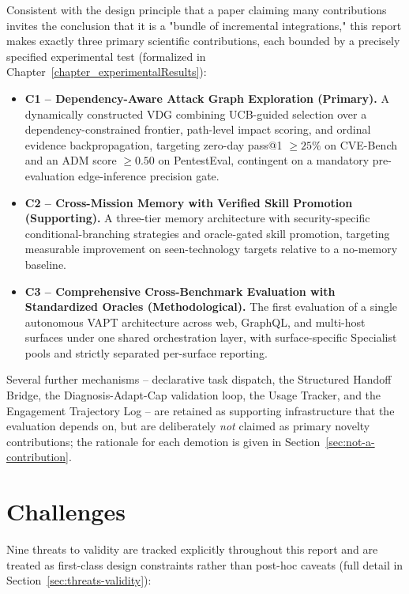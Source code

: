 Consistent with the design principle that a paper claiming many contributions invites the conclusion that it is a "bundle of incremental integrations," this report makes exactly three primary scientific contributions, each bounded by a precisely specified experimental test (formalized in Chapter~\ref{chapter_experimentalResults}):

\begin{itemize}
    \item \textbf{C1 -- Dependency-Aware Attack Graph Exploration (Primary).} A dynamically constructed VDG combining UCB-guided selection over a dependency-constrained frontier, path-level impact scoring, and ordinal evidence backpropagation, targeting zero-day pass@1 $\geq 25\%$ on CVE-Bench and an ADM score $\geq 0.50$ on PentestEval, contingent on a mandatory pre-evaluation edge-inference precision gate.
    \item \textbf{C2 -- Cross-Mission Memory with Verified Skill Promotion (Supporting).} A three-tier memory architecture with security-specific conditional-branching strategies and oracle-gated skill promotion, targeting measurable improvement on seen-technology targets relative to a no-memory baseline.
    \item \textbf{C3 -- Comprehensive Cross-Benchmark Evaluation with Standardized Oracles (Methodological).} The first evaluation of a single autonomous VAPT architecture across web, GraphQL, and multi-host surfaces under one shared orchestration layer, with surface-specific Specialist pools and strictly separated per-surface reporting.
\end{itemize}

Several further mechanisms -- declarative task dispatch, the Structured Handoff Bridge, the Diagnosis-Adapt-Cap validation loop, the Usage Tracker, and the Engagement Trajectory Log -- are retained as supporting infrastructure that the evaluation depends on, but are deliberately \emph{not} claimed as primary novelty contributions; the rationale for each demotion is given in Section~\ref{sec:not-a-contribution}.

\section{Challenges}
\label{sec:intro_challenges}
\label{sec:threats-validity}

Nine threats to validity are tracked explicitly throughout this report and are treated as first-class design constraints rather than post-hoc caveats (full detail in Section~\ref{sec:threats-validity}):


